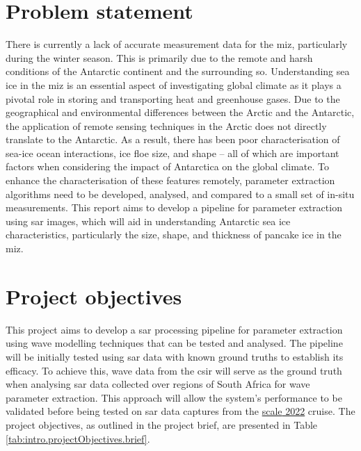 \section{Problem statement}
\label{sec:intro.problemstatement}
There is currently a lack of accurate measurement data for the \ac{miz}, particularly during the winter season. This is primarily due to the remote and harsh conditions of the Antarctic continent and the surrounding \ac{so}. Understanding sea ice in the \acs{miz} is an essential aspect of investigating global climate as it plays a pivotal role in storing and transporting heat and greenhouse gases. Due to the geographical and environmental differences between the Arctic and the Antarctic, the application of remote sensing techniques in the Arctic does not directly translate to the Antarctic. As a result, there has been poor characterisation of sea-ice ocean interactions, ice floe size, and shape – all of which are important factors when considering the impact of Antarctica on the global climate. To enhance the characterisation of these features remotely, parameter extraction algorithms need to be developed, analysed, and compared to a small set of in-situ measurements. This report aims to develop a pipeline for parameter extraction using \ac{sar} images, which will aid in understanding Antarctic sea ice characteristics, particularly the size, shape, and thickness of pancake ice in the \acs{miz}.
\section{Project objectives}
\label{sec:intro.projectObjectives}
This project aims to develop a \acs{sar} processing pipeline for parameter extraction using wave modelling techniques that can be tested and analysed. The pipeline will be initially tested using \acs{sar} data with known ground truths to establish its efficacy. To achieve this, wave data from the \ac{csir} will serve as the ground truth when analysing \acs{sar} data collected over regions of South Africa for wave parameter extraction. This approach will allow the system's performance to be validated before being tested on \acs{sar} data captures from the \href{https://www.sanap.ac.za/scale-winter-cruise-2022}{\ac{scale} 2022} cruise. The project objectives, as outlined in the project brief, are presented in Table \ref{tab:intro.projectObjectives.brief}.

